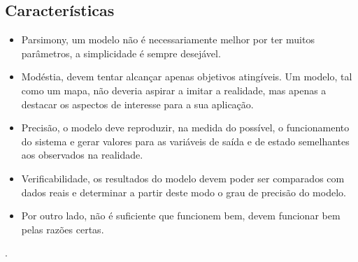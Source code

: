 \documentclass[11pt, letterpaper, portuguese]{article}
\begin{document}
\subsection{Características}
\begin{itemize}
    \item Parsimony, um modelo não é necessariamente melhor por ter muitos parâmetros, a simplicidade é sempre desejável.
    \item Modéstia, devem tentar alcançar apenas objetivos atingíveis. Um modelo, tal como um mapa, não deveria aspirar a imitar a realidade, mas apenas a destacar os aspectos de interesse para a sua aplicação.
    \item Precisão, o modelo deve reproduzir, na medida do possível, o funcionamento do sistema e gerar valores para as variáveis de saída e de estado semelhantes aos observados na realidade.
    \item Verificabilidade, os resultados do modelo devem poder ser comparados com dados reais e determinar a partir deste modo o grau de precisão do modelo.
    \item  Por outro lado, não é suficiente que funcionem bem, devem funcionar bem pelas razões certas.

    \end{itemize}.
\end{document}
